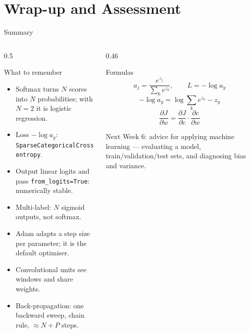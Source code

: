\documentclass[aspectratio=169,10pt]{beamer}
\begin{document}
\section{Wrap-up and Assessment}

\begin{frame}{Summary}
  \begin{columns}[T,onlytextwidth]
    \begin{column}{0.5\textwidth}
      \begin{block}{What to remember}
        \footnotesize
        \begin{itemize}
          \item Softmax turns $N$ scores into $N$ probabilities; with $N=2$ it is logistic
                regression.
          \item Loss $-\log a_y$: \texttt{SparseCategoricalCrossentropy}.
          \item Output linear logits and pass \texttt{from\_logits=True}: numerically stable.
          \item Multi-label: $N$ sigmoid outputs, not softmax.
          \item Adam adapts a step size per parameter; it is the default optimiser.
          \item Convolutional units see windows and share weights.
          \item Back-propagation: one backward sweep, chain rule, $\approx N+P$ steps.
        \end{itemize}
      \end{block}
    \end{column}
    \begin{column}{0.46\textwidth}
      \begin{block}{Formulas}
        \[ a_j=\frac{e^{z_j}}{\sum_k e^{z_k}},\qquad L=-\log a_y \]
        \[ -\log a_y = \log\sum_k e^{z_k}-z_y \]
        \[ \frac{\partial J}{\partial w}=\frac{\partial J}{\partial c}\cdot\frac{\partial c}{\partial w} \]
      \end{block}
      \begin{block}{Next}
        \footnotesize Week 6: advice for applying machine learning --- evaluating a model,
        train/validation/test sets, and diagnosing bias and variance.
      \end{block}
    \end{column}
  \end{columns}
\end{frame}
\end{document}
